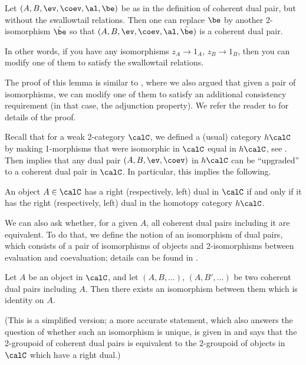 \begin{lemma}\label{l:dual-pair-upgrade}
  Let $(A, B, \ev, \coev, \al, \be)$ be as in the definition of
  coherent dual pair, but without the swallowtail relations.
  Then one can replace $\be$ by another
  2-isomorphism $\tilde \be$ so that
  $(A, B, \ev, \coev, \al, \tilde \be)$ is a coherent dual pair.
\end{lemma}

In other words, if you have any isomorphisms $z_A\to 1_A$, $z_B\to 1_B$,
then you can modify one of them to satisfy the swallowtail relations.

The proof of this lemma is similar to , where
we also argued that given a pair of isomorphisms, we can modify one of them
to satisfy an additional consistency requirement (in that case, the adjunction
property). We refer the reader to \cite[Theorem 2.7]{pstragowski} for
details of the proof.

Recall that for a weak 2-category $\calC$, we defined a (usual) category
$h\calC$ by making 1-morphisms that were isomorphic in $\calC$ equal in
$h\calC$, see . Then  implies that
any dual pair $(A,B, \ev, \coev)$ in $h\calC$ can be ``upgraded'' to a
coherent dual pair in $\calC$. In particular, this implies the following.

\begin{corollary}\label{c:dual-objects-2cat}
  An object $A\in \calC$ has a right \textup{(}respectively, left\textup{)} dual in $\calC$
  if and only if it has the right \textup{(}respectively, left\textup{)}
  dual in the homotopy category $h\calC$.
\end{corollary}

We can also ask whether, for a given $A$, all coherent dual pairs
including it are equivalent. To do that, we define the notion of
an isomorphism of dual pairs, which consists of a pair of isomorphisms of
objects and 2-isomorphisms between evaluation and coevaluation; details
can be found in \cite[Section 2.2]{pstragowski}.


\begin{theorem}\label{t:coh-dual-pair-unique}
    Let $A$ be an object in $\calC$, and let $(A,B, \dots)$,
    $(A, B', \dots)$ be two coherent dual pairs including $A$.
    Then there exists an isomorphism between them which is identity on $A$.
\end{theorem}

(This is a simplified version; a more accurate statement, which also
answers the question of whether such an isomorphism is unique, is given
in \cite[Theorem 2.14]{pstragowski} and says that the 2-groupoid of
coherent dual pairs is equivalent to the 2-groupoid of
objects in $\calC$ which have a right dual.)

